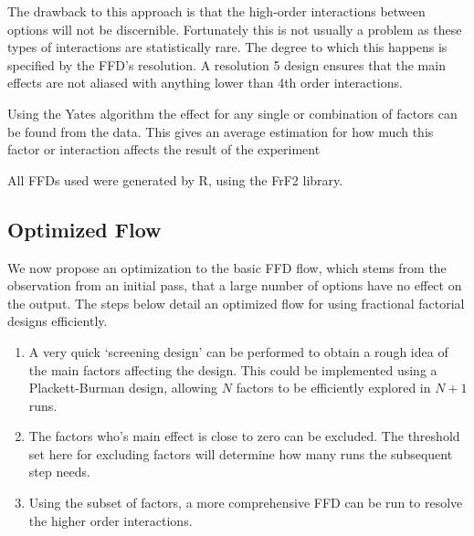 \documentclass[twocolumn]{article}
\begin{document}
The drawback to this approach is that the high-order interactions between options will not be discernible. Fortunately this is not usually a problem as these types of interactions are statistically rare. The degree to which this happens is specified by the FFD's resolution. A resolution 5 design ensures that the main effects are not aliased with anything lower than 4th order interactions.

Using the Yates algorithm\cite{BoxHunter} the effect for any single or combination of factors can be found from the data. This gives an average estimation for how much this factor or interaction affects the result of the experiment




All FFDs used were generated by R\cite{R}, using the FrF2 library\cite{FrF2}.

\subsection*{Optimized Flow}

We now propose an optimization to the basic FFD flow, which stems from the observation from an initial pass, that a large number of options have no effect on the output. The steps below detail an optimized flow for using fractional factorial designs efficiently.
\begin{enumerate}
	\setlength{\itemsep}{0em}
	\vspace{-1mm}
	\item A very quick `screening design' can be performed to obtain a rough idea of the main factors affecting the design. This could be implemented using a Plackett-Burman design\cite{Bose1940}, allowing $N$ factors to be efficiently explored in $N+1$ runs.
	\item The factors who's main effect is close to zero can be excluded. The threshold set here for excluding factors will determine how many runs the subsequent step needs.
	\item Using the subset of factors, a more comprehensive FFD can be run to resolve the higher order interactions.
\end{enumerate}
\end{document}
